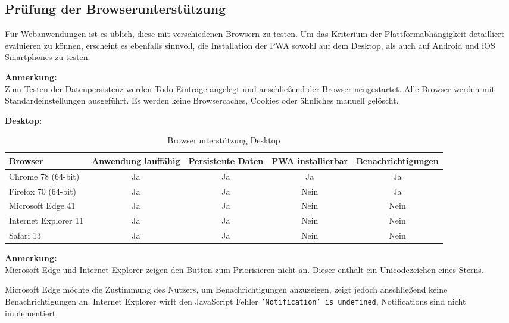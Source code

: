 \subsection{Prüfung der Browserunterstützung}
Für Webanwendungen ist es üblich, diese mit verschiedenen Browsern zu testen. Um das Kriterium der Plattformabhängigkeit detailliert evaluieren zu können, erscheint es ebenfalls sinnvoll, die Installation der PWA sowohl auf dem Desktop, als auch auf Android und iOS Smartphones zu testen.

\textbf{Anmerkung:}\\
Zum Testen der Datenpersistenz werden Todo-Einträge angelegt und anschließend der Browser neugestartet.
Alle Browser werden mit Standardeinstellungen ausgeführt. Es werden keine Browsercaches, Cookies oder ähnliches manuell gelöscht.

\textbf{Desktop:}

\begin{table}[H]
	\centering
	\begin{tabularx}{\textwidth}{|l||C|C|C|C|}
		\hline
		Browser              & Anwendung lauffähig & Persistente Daten & PWA installierbar & Benachrichtigungen \\
		\hline
		Chrome 78 (64-bit)   & Ja                  & Ja                & Ja                & Ja                 \\
		Firefox 70 (64-bit)  & Ja                  & Ja                & Nein              & Ja                 \\
		Microsoft Edge 41    & Ja                  & Ja                & Nein              & Nein               \\
		Internet Explorer 11 & Ja                  & Ja                & Nein              & Nein               \\
		Safari 13            & Ja                  & Ja                & Nein              & Nein               \\
		\hline
	\end{tabularx}
	\caption{Browserunterstützung Desktop} \label{tab:browser_desktop}
\end{table}

\textbf{Anmerkung:}\\
Microsoft Edge und Internet Explorer zeigen den Button zum Priorisieren nicht an. Dieser enthält ein Unicodezeichen eines Sterns.

Microsoft Edge möchte die Zustimmung des Nutzers, um Benachrichtigungen anzuzeigen, zeigt jedoch anschließend keine Benachrichtigungen an. Internet Explorer wirft den JavaScript Fehler \texttt{'Notification' is undefined}, Notifications sind nicht implementiert.

